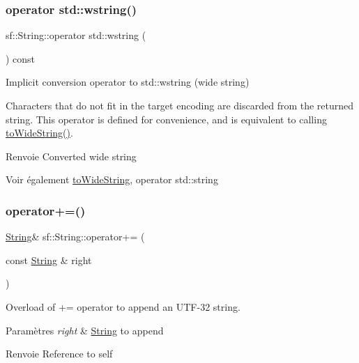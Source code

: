 \subsubsection{\texorpdfstring{operator std\+::wstring()}{operator std::wstring()}}
{\footnotesize\ttfamily sf\+::\+String\+::operator std\+::wstring (\begin{DoxyParamCaption}{ }\end{DoxyParamCaption}) const}



Implicit conversion operator to std\+::wstring (wide string) 

Characters that do not fit in the target encoding are discarded from the returned string. This operator is defined for convenience, and is equivalent to calling \hyperlink{classsf_1_1String_a9d81aa3103e7e2062bd85d912a5aecf1}{to\+Wide\+String()}.

\begin{DoxyReturn}{Renvoie}
Converted wide string
\end{DoxyReturn}
\begin{DoxySeeAlso}{Voir également}
\hyperlink{classsf_1_1String_a9d81aa3103e7e2062bd85d912a5aecf1}{to\+Wide\+String}, operator std\+::string 
\end{DoxySeeAlso}
\mbox{\label{classsf_1_1String_ae6563ce2c243ae2160eea8a354199f4e}} 
\subsubsection{\texorpdfstring{operator+=()}{operator+=()}}
{\footnotesize\ttfamily \hyperlink{classsf_1_1String}{String}\& sf\+::\+String\+::operator+= (\begin{DoxyParamCaption}\item[{const \hyperlink{classsf_1_1String}{String} \&}]{right }\end{DoxyParamCaption})}



Overload of += operator to append an U\+T\+F-\/32 string. 


\begin{DoxyParams}{Paramètres}
{\em right} & \hyperlink{classsf_1_1String}{String} to append\\
\hline
\end{DoxyParams}
\begin{DoxyReturn}{Renvoie}
Reference to self 
\end{DoxyReturn}
\mbox{\label{classsf_1_1String_a096255c066e5ef8c31952216b8ce9c42}} 
